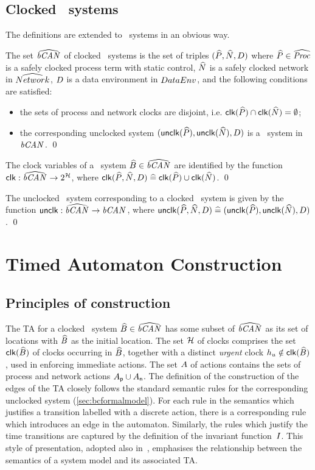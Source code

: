 \subsection{Clocked \bcandle\ systems}
The definitions are extended to \bcandle\ systems in an obvious way.
\begin{definition} 
The set ${\widehat{{\text{\it bCAN\/}_{}}}}$ of clocked \bcandle\ systems is the set of triples
$({\widehat{P}},{\widehat{N}},{D})$ where ${\widehat{P}} \in \widehat{\text{\it Proc\/}_{}}$ is a safely clocked process term with
static control, ${\widehat{N}}$ is a safely clocked network in $\widehat{Network_{}}$, 
${D}$ is a data environment in ${DataEnv_{}}$, and the following conditions are 
satisfied:
\begin{itemize}
\item the sets of process and network clocks are disjoint, i.e.
${\mathop{\sf clk}}({\widehat{P}}) \cap {\mathop{\sf clk}}({\widehat{N}}) = \emptyset$;
\item the corresponding unclocked system $({\mathop{{\sf unclk}}}({\widehat{P}}),{\mathop{{\sf unclk}}}({\widehat{N}}),{D})$ 
is a \bcandle\ system in ${\text{\it bCAN\/}_{}}$.
\qed
\end{itemize}
\end{definition}
\begin{definition}
The clock variables of a \bcandle\ system ${\widehat{{B}}} \in {\widehat{{\text{\it bCAN\/}_{}}}}$
are identified by the function $\clk : \CSys{} \fun 2^\clocks$,
where ${\mathop{\sf clk}}({\widehat{P}},{\widehat{N}},{D}) \mathrel{\widehat=} {\mathop{\sf clk}}({\widehat{P}}) \cup {\mathop{\sf clk}}({\widehat{N}})$.
\qed
\end{definition}
\begin{definition}
The unclocked \bcandle\ system corresponding to a clocked
\bcandle\ system is given by the function ${\mathop{{\sf unclk}}} : {\widehat{{\text{\it bCAN\/}_{}}}} \rightarrow {\text{\it bCAN\/}_{}}$,
where ${\mathop{{\sf unclk}}}({\widehat{P}},{\widehat{N}},{D}) \mathrel{\widehat=} ({\mathop{{\sf unclk}}}({\widehat{P}}),{\mathop{{\sf unclk}}}({\widehat{N}}),{D})$.
\qed
\end{definition}

\section{Timed Automaton Construction\label{sec:tgcons}} 
\subsection{Principles of construction}
The TA for a clocked \bcandle\ system ${\widehat{{B}}} \in {\widehat{{\text{\it bCAN\/}_{}}}}$ has some subset
of ${\widehat{{\text{\it bCAN\/}_{}}}}$ as its set of locations with ${\widehat{{B}}}$ as the initial location.
The set $\clocks$ of clocks comprises the set ${\mathop{\sf clk}}({\widehat{{B}}})$ of clocks
occurring in ${\widehat{{B}}}$, together with a distinct \emph{urgent} clock
$h_{u} \notin {\mathop{\sf clk}}({\widehat{{B}}})$, used in enforcing immediate actions.
The set $A$ of actions contains the sets of process and network
actions ${A_{\sf p}} \cup {A_{\sf n}}$. The definition of the
construction of the edges of the TA closely follows the standard
semantic rules for the corresponding unclocked system
(\Sec\ref{sec:bcformalmodel}). For each rule in the semantics which
justifies a transition labelled with a discrete action, there is a
corresponding rule which introduces an edge in the
automaton. Similarly, the rules which justify the time transitions are
captured by the definition of the invariant function~$I$. This
style of presentation, adopted also in~\cite{nic:92,db:96}, emphasises
the relationship between the semantics of a system model and its
associated TA.
 
